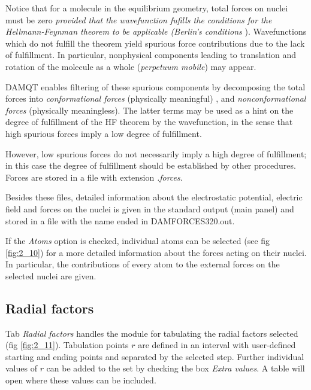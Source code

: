 \documentclass[10pt]{article}
\begin{document}
Notice that for a molecule in the equilibrium geometry, 
total forces on nuclei
must be zero {\it provided that the wavefunction fufills the
conditions for the Hellmann-Feynman theorem to
be applicable (Berlin's conditions\footnotemark
{}}).
Wavefunctions which do not fulfill the theorem yield 
spurious force contributions due to the lack of
fulfillment. 
In particular, nonphysical components leading to translation and
rotation of the molecule as a whole ({\it perpetuum mobile}) may appear.


DAMQT enables filtering of these spurious components by decomposing the total forces
into {\it conformational forces}
(physically meaningful) , and 
{\it nonconformational forces} (physically meaningless).
The latter terms may be used as a hint on the degree of fulfillment of the HF
theorem by the wavefunction, in the sense that high spurious forces imply a
low degree of fulfillment. 

However, low spurious forces do not necessarily
imply a high degree of fulfillment; in this case the degree of fulfillment
should be established by other procedures.
Forces are stored in a file with extension {\it .forces}.

Besides these files, detailed information about the electrostatic
potential, electric 
field and forces on the
nuclei is given in the standard output (main panel)
and stored in a file with the name ended in DAMFORCES320.out.

If the {\it Atoms} option is checked, individual atoms can be selected
(see fig \ref{fig:2_10}) for a more detailed information about the forces
acting
on their nuclei. In particular, the contributions of every atom to the external
forces on the selected nuclei are given.


\subsection{Radial factors \label{sec:2.11}}

Tab {\it Radial factors} handles the module for
tabulating the radial factors selected (fig \ref{fig:2_11}). Tabulation points
$r$
are defined in an interval with user-defined starting and ending points and
separated by the selected step. Further individual values of $r$ can be added to
the set by checking the box {\it Extra values}. A table will open where these values can be included.
\end{document}
